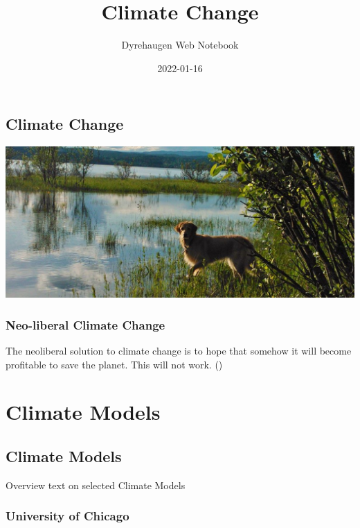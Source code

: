 \documentclass[
]{book}
\title{Climate Change}
\author{Dyrehaugen Web Notebook}
\date{2022-01-16}
\begin{document}
\maketitle

{
\setcounter{tocdepth}{1}
\tableofcontents
}
\hypertarget{climate-change}{%
\chapter{Climate Change}\label{climate-change}}

\includegraphics{fig/zelda.jpg}

\hypertarget{neo-liberal-climate-change}{%
\section{Neo-liberal Climate Change}\label{neo-liberal-climate-change}}

The neoliberal solution to climate change is to hope
that somehow it will become profitable to save the planet.
This will not work.
(\citet{ExistentialComics})

\hypertarget{part-climate-models}{%
\part{Climate Models}\label{part-climate-models}}

\hypertarget{climate-models}{%
\chapter{Climate Models}\label{climate-models}}

Overview text on selected Climate Models

\hypertarget{university-of-chicago}{%
\section{University of Chicago}\label{university-of-chicago}}
\end{document}
